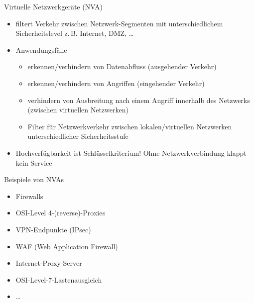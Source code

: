 \begin{flashcard}[]{Virtuelle Netzwerkgeräte (NVA)}
  \begin{itemize}
    \item filtert Verkehr zwischen Netzwerk-Segmenten mit unterschiedlichem Sicherheitslevel\newline
      z.\,B. Internet, DMZ, \ldots
    \item Anwendungsfälle
      \begin{itemize}
        \item erkennen/verhindern von Datenabfluss (ausgehender Verkehr)
        \item erkennen/verhindern von Angriffen (eingehender Verkehr)
        \item verhindern von Ausbreitung nach einem Angriff innerhalb des Netzwerks (zwischen virtuellen Netzwerken)
        \item Filter für Netzwerkverkehr zwischen lokalen/virtuellen Netzwerken unterschiedlicher Sicherheitsstufe
      \end{itemize}
    \item Hochverfügbarkeit ist Schlüsselkriterium! Ohne Netzwerkverbindung klappt kein Service
  \end{itemize}
\end{flashcard}

\begin{flashcard}[]{Beispiele von NVAs}
  \begin{itemize}
    \item Firewalls
    \item OSI-Level 4-(reverse)-Proxies
    \item VPN-Endpunkte (IPsec)
    \item WAF (Web Application Firewall)
    \item Internet-Proxy-Server
    \item OSI-Level-7-Lastenausgleich
    \item \ldots
  \end{itemize}
\end{flashcard}

